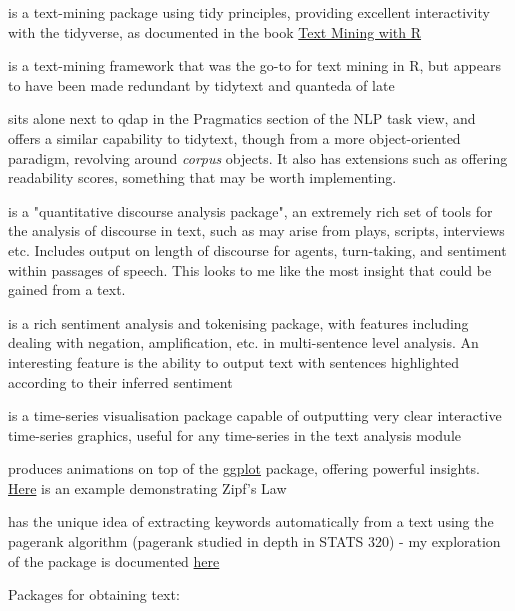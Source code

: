 \documentclass[11pt]{article}
\begin{document}
\begin{description}
\item[{\href{https://github.com/juliasilge/tidytext}{tidytext}}] is a text-mining
package using tidy principles, providing excellent interactivity with
the tidyverse, as documented in the book
\href{https://www.tidytextmining.com}{Text Mining with R}
\item[{\href{http://tm.r-forge.r-project.org/}{tm}}] is a text-mining framework
that was the go-to for text mining in R, but appears to have been made
redundant by tidytext and quanteda of late
\item[{\href{https://quanteda.io/}{quanteda}}] sits alone next to qdap in the
Pragmatics section of the NLP task view, and offers a similar
capability to tidytext, though from a more object-oriented paradigm,
revolving around \emph{corpus} objects. It also has extensions such as
offering readability scores, something that may be worth implementing.
\item[{\href{https://trinker.github.io/qdap/vignettes/qdap\_vignette.html}{qdap}}] is a "quantitative discourse analysis package", an extremely rich set
of tools for the analysis of discourse in text, such as may arise from
plays, scripts, interviews etc. Includes output on length of discourse
for agents, turn-taking, and sentiment within passages of speech. This
looks to me like the most insight that could be gained from a text.
\item[{\href{https://github.com/trinker/sentimentr}{sentimentr}}] is a rich
sentiment analysis and tokenising package, with features including
dealing with negation, amplification, etc. in multi-sentence level
analysis. An interesting feature is the ability to output text with
sentences highlighted according to their inferred sentiment
\item[{\href{https://rstudio.github.io/dygraphs/}{dygraphs}}] is a time-series
visualisation package capable of outputting very clear interactive
time-series graphics, useful for any time-series in the text analysis
module
\item[{\href{https://github.com/thomasp85/gganimate}{gganimate}}] produces  animations on top of the \href{https://github.com/tidyverse/ggplot2}{ggplot} package, offering
powerful insights. \href{https://www.r-bloggers.com/investigating-words-distribution-with-r-zipfs-law-2/}{Here} is an example demonstrating Zipf's Law
\item[{\href{https://github.com/bnosac/textrank}{textrank}}] has the unique idea
of extracting keywords automatically from a text using the pagerank
algorithm (pagerank studied in depth in STATS 320) - my exploration of
the package is documented \href{./textrank\_exploration.Rmd}{here}
\item Packages for obtaining text:


\end{description}
\end{document}

